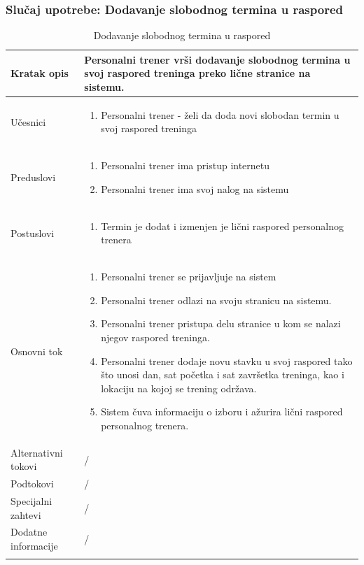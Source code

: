 \subsubsection{Slučaj upotrebe: Dodavanje slobodnog termina u raspored}
\begin{longtable}{| p{} | p{} |} 
\hline
    Kratak opis &  Personalni trener vrši dodavanje slobodnog termina u svoj raspored treninga preko lične stranice na sistemu.\\ 
\hline    
    Učesnici &
    \begin{enumerate}
        \item Personalni trener - želi da doda novi slobodan termin u svoj raspored treninga
    \end{enumerate}\\
\hline
   Preduslovi & 
   \begin{enumerate}
        \item Personalni trener ima pristup internetu
        \item Personalni trener ima svoj nalog na sistemu
    \end{enumerate}\\
\hline  
    Postuslovi &
    \begin{enumerate}
        \item Termin je dodat i izmenjen je lični raspored personalnog trenera
    \end{enumerate}\\
\hline
    Osnovni tok & 
    \begin{enumerate}
        \item Personalni trener se prijavljuje na sistem
        \item Personalni trener odlazi na svoju stranicu na sistemu.
        \item Personalni trener pristupa delu stranice u kom se nalazi njegov raspored treninga.
        \item Personalni trener dodaje novu stavku u svoj raspored tako što unosi dan, sat početka i sat završetka treninga, kao i lokaciju na kojoj se trening održava.
        \item Sistem čuva informaciju o izboru i ažurira lični raspored personalnog trenera.
    \end{enumerate}\\
\hline
    Alternativni tokovi & /\\
\hline
    Podtokovi & /\\
\hline
    Specijalni zahtevi & /\\
\hline
    Dodatne informacije & /\\
\hline
\caption{Dodavanje slobodnog termina u raspored} %
\end{longtable}

